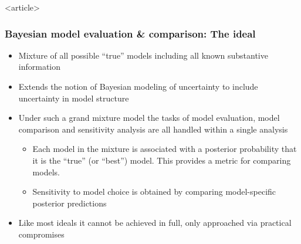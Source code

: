 \documentclass[handout]{beamer}
\begin{document}
\begin{frame}<article>
  \frametitle{Bayesian model evaluation \& comparison: The ideal}

  \begin{itemize}
  \item Mixture of all possible ``true'' models including all known
    substantive information
  \item Extends the notion of Bayesian modeling of uncertainty to
    include uncertainty in model structure
  \item Under such a grand mixture model the tasks of model
    evaluation, model comparison and sensitivity analysis are all
    handled within a single analysis
    \begin{itemize}
    \item Each model in the mixture is associated with a posterior
      probability that it is the ``true'' (or ``best'') model. This provides a metric
      for comparing models.
    \item Sensitivity to model choice is obtained by comparing
      model-specific posterior predictions
    \end{itemize}
    \item Like most ideals it cannot be achieved in full, only approached via
    practical compromises
  \end{itemize}
  
\end{frame}
\end{document}
